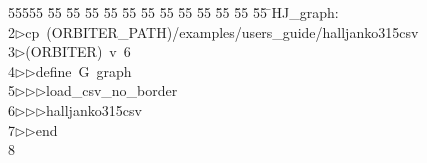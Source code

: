 %
%
\begin{tabbing}
55555 \= 55 \= 55 \= 55 \= 55 \= 55 \= 55 \= 55 \= 55 \= 55 \= 55 \= 55 \= 55 \= \>HJ\_graph:\\[0pt]
2\>$\triangleright$\>cp\ (ORBITER\_PATH)/examples/users\_guide/halljanko315csv\ \\[0pt]
3\>$\triangleright$\>(ORBITER)\ v\ 6\ \\[0pt]
4\>$\triangleright$\>$\triangleright$\>define\ G\ graph\ \\[0pt]
5\>$\triangleright$\>$\triangleright$\>$\triangleright$\>load\_csv\_no\_border\ \\[0pt]
6\>$\triangleright$\>$\triangleright$\>$\triangleright$\>halljanko315csv\ \\[0pt]
7\>$\triangleright$\>$\triangleright$\>end\\[0pt]
8\>\end{tabbing}
